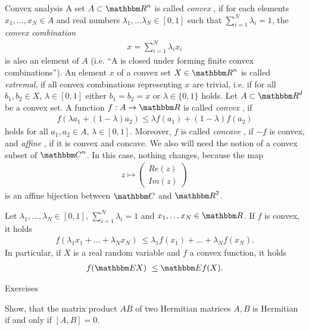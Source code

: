  \begin{section}{Convex analysis} 
A set $A \subset \bbmR^n$ is called \emph{convex}  , if for each elements $x_1,\dots, x_N \in A$ and real numbers $\lambda_1,\dots \lambda_N \in [0,1]$
 such that $\sum_{i=1}^N \lambda_i = 1$, the \emph{convex combination}  
 \begin{align}
  x = \sum_{i=1}^N \lambda_i x_i 
 \end{align}
 is also an element of $A$ (i.e. ``A is closed under forming finite convex combinations''). An element $x$ of a convex set $X \in \bbmR^n$ is called \emph{extremal}, if all convex combinations representing $x$ are trivial, i.e. if
 for all $b_1, b_2 \in X$, $\lambda \in [0,1]$ either $b_1 = b_2 = x$ or $\lambda \in \{0,1\}$ holds. Let $A \subset \bbmR^d$ be a convex set. A function $f: A \rightarrow \bbmR$
 is called \emph{convex}  , if  
 \begin{align}
  f(\lambda a_1 + (1-\lambda) a_2) \leq \lambda f(a_1) + (1-\lambda) f(a_2) 
 \end{align}
 holds for all $a_1, a_2 \in A$, $\lambda \in [0,1]$. Moreover, $f$ is called \emph{concave}  , if $-f$ is convex, and \emph{affine} , 
 if it is convex and concave. We also will need the notion of a convex subset of $\bbmC^n$. In this case, nothing changes, because the map 
 \begin{align}
  z \mapsto \left(\begin{array}{c} Re(z) \\ Im(z) \end{array}\right)
 \end{align}
 is an affine bijection between $\bbmC$ and $\bbmR^2$.
 \begin{proposition}
  Let $\lambda_1, \dots, \lambda_N \in [0,1]$, $\sum_{i=1}^N \lambda_i =1$ and $x_1,\dots x_N \in \bbmR$. If $f$ is convex, it holds
  \begin{align}
   f(\lambda_1 x_1 + \dots + \lambda_N x_N) \ \leq \lambda_1 f(x_1) + \dots + \lambda_N f(x_N). 
  \end{align}
  In particular, if $X$ is a real random variable and $f$ a convex function, it holds
   \begin{align}
    f( \bbmE X ) \ \leq \bbmE f(X).
   \end{align}
 \end{proposition}
\end{section}
\begin{section}{Exercises}
\begin{exercise}
	Show, that the matrix product $AB$ of two Hermitian matrices $A,B$ is Hermitian if and only if $[A,B] = 0$.
\end{exercise}
\end{section}


